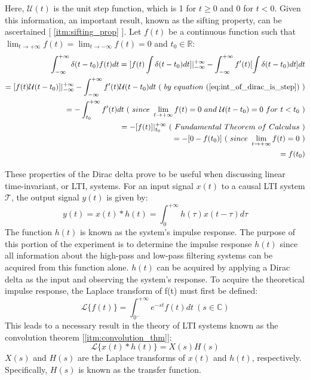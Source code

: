 \documentclass{article}
\begin{document}
	Here, $\mathcal{U}(t)$ is the unit step function, which is 1 for $t \geq 0$ and 0 for $t < 0$. Given this information, an important result, known as the sifting property, can be ascertained [ \ref{itm:sifting_prop} ]. Let $f(t)$ be a continuous function such that $\lim_{ t \to +\infty } f(t) = \lim_{ t \to -\infty } f(t) = 0$ and $t_0 \in \mathbb{R}$:
	\begin{equation}
	\label{eq:sifting_property}
	\begin{aligned}
	\int_{-\infty}^{+\infty} \delta( t - t_0 ) f(t) dt = [ f(t)\int \delta( t - t_0 ) dt ]\rvert_{-\infty}^{+\infty} - \int_{-\infty}^{+\infty} f'(t)[ \int \delta( t - t_0 ) dt ]dt \\
	= [ f(t)\mathcal{U}( t - t_0 ) ]\rvert_{-\infty}^{+\infty} - \int_{-\infty}^{+\infty} f'(t)\mathcal{U}( t - t_0 )dt \ ( \ by \ equation \ (\ref{eq:int_of_dirac_is_step}) \ ) \\
	= -\int_{t_0}^{+\infty} f'(t)dt \ ( \ since \ \lim_{ t \to +\infty } f(t) = 0 \ and \ \mathcal{U}( t - t_0 ) = 0 \ for \ t < t_0 \ ) \\
	= -[ f(t) ]\rvert_{t_0}^{+\infty} \ ( \ Fundamental \ Theorem \ of \ Calculus \ ) \\
	= -[ 0 - f(t_0) ] \ ( \ since \ \lim_{ t \to +\infty } f(t) = 0 \ ) \\
	= f(t_0) \\
	\end{aligned}
	\end{equation}
	
	These properties of the Dirac delta prove to be useful when discussing linear time-invariant, or LTI, systems. For an input signal $x(t)$ to a causal LTI system $\mathcal{T}$, the output signal $y(t)$ is given by:
	\begin{equation}
	\label{eq:causal_lti_conv}
	y(t) = x(t) * h(t) = \int_{0}^{+\infty} h(\tau)x(t-\tau)d\tau
	\end{equation}
	The function $h(t)$ is known as the system's impulse response. The purpose of this portion of the experiment is to determine the impulse response $h(t)$ since all information about the high-pass and low-pass filtering systems can be acquired from this function alone. $h(t)$ can be acquired by applying a Dirac delta as the input and observing the system's response.
	To acquire the theoretical impulse response, the Laplace transform of f(t) must first be defined:
	\begin{equation}
	\label{eq:lt_def}
	\mathcal{L}\{f(t)\} = \int_{0^{-}}^{+\infty} e^{-st}f(t)dt \ ( s \in \mathbb{C} )
	\end{equation}
	This leads to a necessary result in the theory of LTI systems known as the convolution theorem [\ref{itm:convolution_thm}]:
	\begin{equation}
	\label{eq:conv_thm}
	\mathcal{L}\{ x(t) * h(t) \} = X(s)H(s)
	\end{equation}
	$X(s)$ and $H(s)$ are the Laplace transforms of $x(t)$ and $h(t)$, respectively. Specifically, $H(s)$ is known as the transfer function.
	
\end{document}

